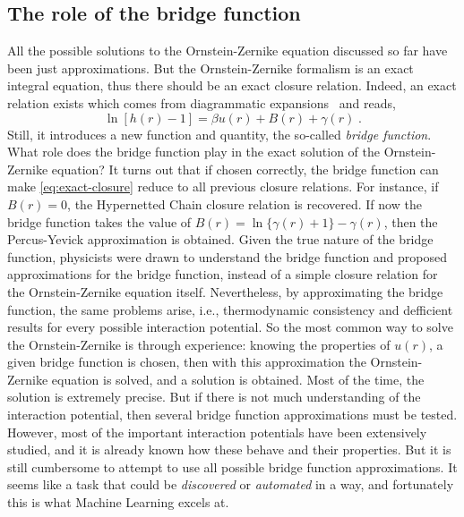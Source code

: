 \subsection{The role of the bridge function}
All the possible solutions to the Ornstein-Zernike equation discussed so far 
have been just approximations.
But the Ornstein-Zernike formalism is an exact integral equation, thus there should be an
exact closure relation. Indeed, an exact relation exists which comes from diagrammatic
expansions~\cite{hansenTheorySimpleLiquids2013} and reads,
\begin{equation}
    \ln{\left[h(r) - 1\right]} = \beta u(r) + B(r) + \gamma(r) \; .
    \label{eq:exact-closure}
\end{equation}
Still, it introduces a new function and quantity, the so-called \emph{bridge function}.
What role does the bridge function play in the exact solution of the Ornstein-Zernike
equation? It turns out that if chosen correctly, the bridge function can make
\autoref{eq:exact-closure} reduce to all previous closure relations. For instance,
if $B(r)=0$, the Hypernetted Chain closure relation is recovered. If now the bridge
function takes the value of $B(r)=\ln{ \{\gamma(r) + 1\} }-\gamma(r)$, then the 
Percus-Yevick approximation is obtained. Given the true nature of the bridge function,
physicists were drawn to understand the bridge function and proposed approximations for
the bridge function, instead of a simple closure relation for the Ornstein-Zernike
equation itself. Nevertheless, by approximating the bridge function, the same problems
arise, i.e., thermodynamic consistency and defficient results for every possible
interaction potential. So the most common way to solve the Ornstein-Zernike is through
experience: knowing the properties of $u(r)$, a given bridge function is chosen,
then with this approximation the Ornstein-Zernike equation is solved, and a solution is
obtained. Most of the time, the solution is extremely precise. But if there is not
much understanding of the interaction potential, then several bridge function approximations
must be tested. However, most of the important interaction potentials have been
extensively studied, and it is already known how these behave and their properties.
But it is still cumbersome to attempt to use all possible bridge function approximations.
It seems like a task that could be \emph{discovered} or \emph{automated} in a way, and
fortunately this is what Machine Learning excels at.